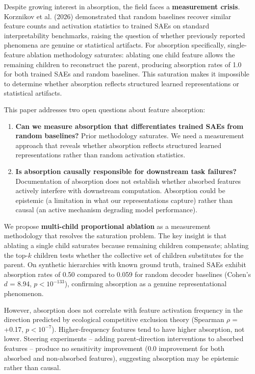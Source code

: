 \documentclass{article}
\begin{document}
Despite growing interest in absorption, the field faces a \textbf{measurement crisis}. Korznikov et al. (2026) demonstrated that random baselines recover similar feature counts and activation statistics to trained SAEs on standard interpretability benchmarks, raising the question of whether previously reported phenomena are genuine or statistical artifacts. For absorption specifically, single-feature ablation methodology saturates: ablating one child feature allows the remaining children to reconstruct the parent, producing absorption rates of 1.0 for both trained SAEs and random baselines. This saturation makes it impossible to determine whether absorption reflects structured learned representations or statistical artifacts.

This paper addresses two open questions about feature absorption:

\begin{enumerate}
\item \textbf{Can we measure absorption that differentiates trained SAEs from random baselines?} Prior methodology saturates. We need a measurement approach that reveals whether absorption reflects structured learned representations rather than random activation statistics.

\item \textbf{Is absorption causally responsible for downstream task failures?} Documentation of absorption does not establish whether absorbed features actively interfere with downstream computation. Absorption could be epistemic (a limitation in what our representations capture) rather than causal (an active mechanism degrading model performance).
\end{enumerate}

We propose \textbf{multi-child proportional ablation} as a measurement methodology that resolves the saturation problem. The key insight is that ablating a single child saturates because remaining children compensate; ablating the top-$k$ children tests whether the collective set of children substitutes for the parent. On synthetic hierarchies with known ground truth, trained SAEs exhibit absorption rates of 0.50 compared to 0.059 for random decoder baselines (Cohen's $d$ = 8.94, $p < 10^{-133}$), confirming absorption as a genuine representational phenomenon.

However, absorption does not correlate with feature activation frequency in the direction predicted by ecological competitive exclusion theory (Spearman $\rho$ = +0.17, $p < 10^{-7}$). Higher-frequency features tend to have higher absorption, not lower. Steering experiments -- adding parent-direction interventions to absorbed features -- produce no sensitivity improvement (0.0 improvement for both absorbed and non-absorbed features), suggesting absorption may be epistemic rather than causal.
\end{document}
